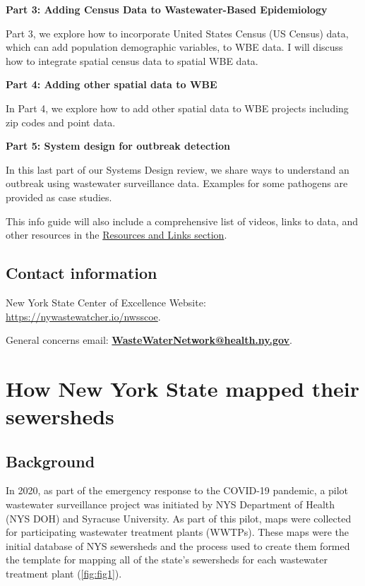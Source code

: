 \documentclass[
]{book}
\begin{document}
\textbf{Part 3: Adding Census Data to Wastewater-Based Epidemiology}

Part 3, we explore how to incorporate United States Census (US Census) data, which can add population demographic variables, to WBE data. I will discuss how to integrate spatial census data to spatial WBE data.

\textbf{Part 4: Adding other spatial data to WBE}

In Part 4, we explore how to add other spatial data to WBE projects including zip codes and point data.

\textbf{Part 5: System design for outbreak detection}

In this last part of our Systems Design review, we share ways to understand an outbreak using wastewater surveillance data. Examples for some pathogens are provided as case studies.

This info guide will also include a comprehensive list of videos, links to data, and other resources in the \hyperref[07-resources-and-links]{Resources and Links section}.

\section{Contact information}\label{contact-information}

New York State Center of Excellence Website: \url{https://nywastewatcher.io/nwsscoe}.

General concerns email: \href{mailto:WasteWaterNetwork@health.ny.gov}{\textbf{WasteWaterNetwork@health.ny.gov}}.

\chapter{How New York State mapped their sewersheds}\label{how-new-york-state-mapped-their-sewersheds}

\section{Background}\label{background}

In 2020, as part of the emergency response to the COVID-19 pandemic, a pilot wastewater surveillance project was initiated by NYS Department of Health (NYS DOH) and Syracuse University. As part of this pilot, maps were collected for participating wastewater treatment plants (WWTPs). These maps were the initial database of NYS sewersheds and the process used to create them formed the template for mapping all of the state's sewersheds for each wastewater treatment plant (\ref{fig:fig1}).
\end{document}
